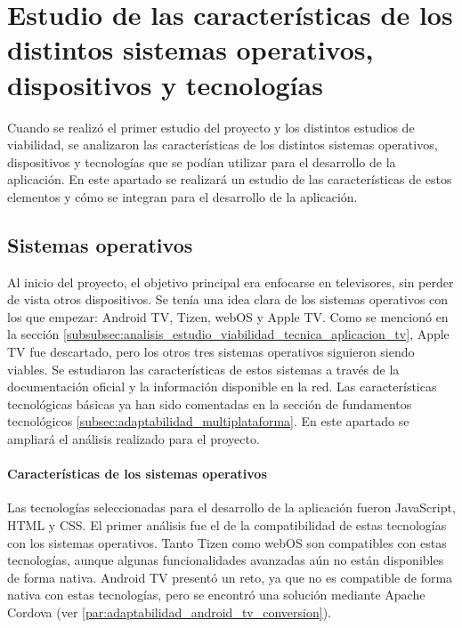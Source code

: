 \section{Estudio de las características de los distintos sistemas operativos, dispositivos y tecnologías}
\label{sec:analisis_estudio}

Cuando se realizó el primer estudio del proyecto y los distintos estudios de viabilidad, se analizaron las 
características de los distintos sistemas operativos, dispositivos y tecnologías que se podían utilizar para
el desarrollo de la aplicación. En este apartado se realizará un estudio de las características de estos 
elementos y cómo se integran para el desarrollo de la aplicación.

\subsection{Sistemas operativos}
\label{subsec:analisis_estudio_sistemas_operativos}

Al inicio del proyecto, el objetivo principal era enfocarse en televisores, sin perder de vista otros dispositivos. 
Se tenía una idea clara de los sistemas operativos con los que empezar: Android TV, Tizen, webOS y Apple TV. Como 
se mencionó en la sección \ref{subsubsec:analisis_estudio_viabilidad_tecnica_aplicacion_tv}, Apple TV fue descartado, 
pero los otros tres sistemas operativos siguieron siendo viables. Se estudiaron las características de estos sistemas 
a través de la documentación oficial y la información disponible en la red. Las características tecnológicas básicas ya 
han sido comentadas en la sección de fundamentos tecnológicos \ref{subsec:adaptabilidad_multiplataforma}. En este apartado 
se ampliará el análisis realizado para el proyecto.

\paragraph{Características de los sistemas operativos}
\label{par:analisis_estudio_sistemas_operativos_caracteristicas}
Las tecnologías seleccionadas para el desarrollo de la aplicación fueron JavaScript, HTML y CSS. El primer análisis fue 
el de la compatibilidad de estas tecnologías con los sistemas operativos. Tanto Tizen como webOS son compatibles con estas tecnologías, 
aunque algunas funcionalidades avanzadas aún no están disponibles de forma nativa. Android TV presentó un reto, ya que no es compatible 
de forma nativa con estas tecnologías, pero se encontró una solución mediante Apache Cordova (ver \ref{par:adaptabilidad_android_tv_conversion}).

